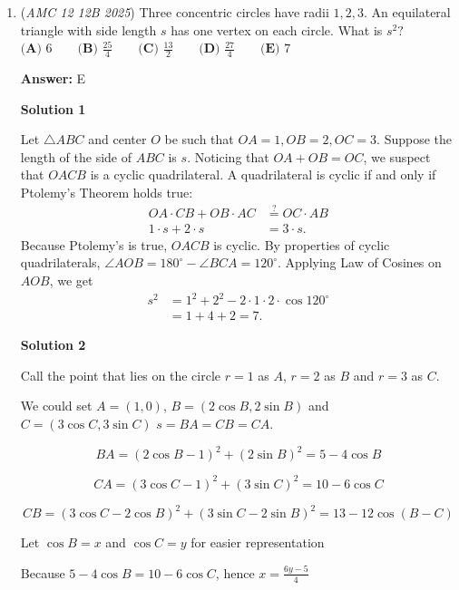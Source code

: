 \begin{enumerate}
 \href{https://mathproblemsolvingskills.wordpress.com/}{MathProblemSolvingSkills.com}

 


 


	\item (\textit{AMC 12 12B 2025}) Three concentric circles have radii $1,2,3$. An equilateral triangle with side length $s$ has one vertex on each circle. What is $s^2?$
$\textbf{(A) } 6 \qquad\textbf{(B) } \frac{25}{4} \qquad\textbf{(C) } \frac{13}{2} \qquad\textbf{(D) } \frac{27}{4} \qquad\textbf{(E) } 7$

 \textbf{Answer: }E



\textbf{Solution 1}

Let $\triangle ABC$ and center $O$ be such that $OA=1, OB=2, OC=3$. Suppose the length of the side of $ABC$ is $s$. Noticing that $OA + OB = OC$, we suspect that $OACB$ is a cyclic quadrilateral. A quadrilateral is cyclic if and only if Ptolemy's Theorem holds true:\begin{align}OA\cdot CB+ OB \cdot AC &\overset{?}{=} OC \cdot AB\\1\cdot s + 2\cdot s &= 3\cdot s.\end{align}Because Ptolemy's is true, $OACB$ is cyclic. By properties of cyclic quadrilaterals,  $\angle AOB = 180^{\circ} - \angle BCA = 120^{\circ}$. Applying Law of Cosines on $AOB$, we get\begin{align}s^2 &= 1^2 + 2^2 - 2 \cdot 1 \cdot 2 \cdot \cos{120^{\circ}}\\&= 1 + 4 + 2 = \boxed{7}.\end{align}

 



\textbf{Solution 2}

Call the point that lies on the circle $r = 1$ as $A$, $r = 2$ as $B$ and $r = 3$ as $C$. 

 We could set $A = (1, 0)$, $B = (2\cos B, 2\sin B)$ and $C = (3\cos C, 3\sin C)$
$s = BA = CB = CA$.

 
 \[BA = (2\cos B - 1)^2 + (2\sin B)^2 = 5 - 4\cos B\]

 \[CA = (3\cos C - 1)^2 + (3\sin C)^2 = 10 - 6\cos C\]

 \[CB = (3\cos C - 2\cos B)^2 + (3\sin C - 2\sin B)^2 = 13 - 12\cos(B - C)\]

 Let $\cos B = x$ and $\cos C = y$ for easier representation

 Because $5 - 4\cos B = 10 - 6\cos C$, hence $x =\frac{6y-5}{4}$


\end{enumerate}
